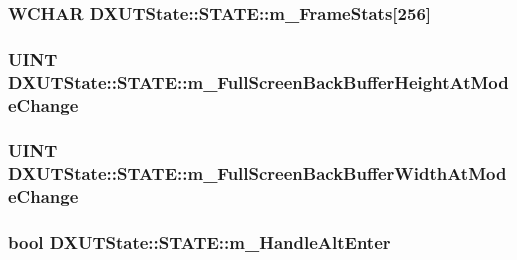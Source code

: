\label{struct_d_x_u_t_state_1_1_s_t_a_t_e_a682a510bf45e93b25adf55c8385f0d7d}
\hypertarget{struct_d_x_u_t_state_1_1_s_t_a_t_e_ab5b65a32e46b0731bac65d4e891aa43d}{
\subsubsection[{m\_\-FrameStats}]{\setlength{\rightskip}{0pt plus 5cm}WCHAR {\bf DXUTState::STATE::m\_\-FrameStats}\mbox{[}256\mbox{]}}}
\label{struct_d_x_u_t_state_1_1_s_t_a_t_e_ab5b65a32e46b0731bac65d4e891aa43d}
\hypertarget{struct_d_x_u_t_state_1_1_s_t_a_t_e_a48f78e048e08a5bd3cf4a43efea95cd0}{
\subsubsection[{m\_\-FullScreenBackBufferHeightAtModeChange}]{\setlength{\rightskip}{0pt plus 5cm}UINT {\bf DXUTState::STATE::m\_\-FullScreenBackBufferHeightAtModeChange}}}
\label{struct_d_x_u_t_state_1_1_s_t_a_t_e_a48f78e048e08a5bd3cf4a43efea95cd0}
\hypertarget{struct_d_x_u_t_state_1_1_s_t_a_t_e_a5c05c68f55ddf278b7388237422738de}{
\subsubsection[{m\_\-FullScreenBackBufferWidthAtModeChange}]{\setlength{\rightskip}{0pt plus 5cm}UINT {\bf DXUTState::STATE::m\_\-FullScreenBackBufferWidthAtModeChange}}}
\label{struct_d_x_u_t_state_1_1_s_t_a_t_e_a5c05c68f55ddf278b7388237422738de}
\hypertarget{struct_d_x_u_t_state_1_1_s_t_a_t_e_a7f10d208e530856c56700a4294dd0e0a}{
\subsubsection[{m\_\-HandleAltEnter}]{\setlength{\rightskip}{0pt plus 5cm}bool {\bf DXUTState::STATE::m\_\-HandleAltEnter}}}
